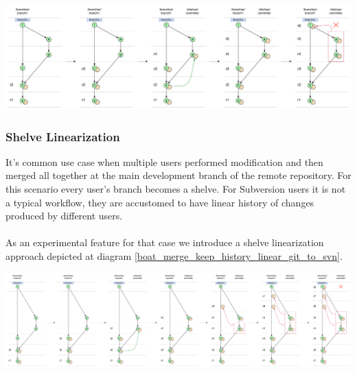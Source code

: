 \begin{center}
\includegraphics[width=\textwidth]{img/diagrams/boat_merge_git_to_svn.pdf}%
\label{boat_merge_git_to_svn}%
\end{center}

\subsubsection{Shelve Linearization}

It's common use case when multiple users performed modification and then merged all together at the main development branch of the remote repository. For this scenario every user's branch becomes a shelve. For Subversion users it is not a typical workflow, they are accustomed to have linear history of changes produced by different users.
\\\\
As an experimental feature for that case we introduce a shelve linearization approach depicted at diagram \ref{boat_merge_keep_history_linear_git_to_svn}.
\begin{center}
\includegraphics[width=\textwidth]{img/diagrams/boat_merge_keep_history_linear_git_to_svn.pdf}%
\label{boat_merge_keep_history_linear_git_to_svn}%
\end{center}


